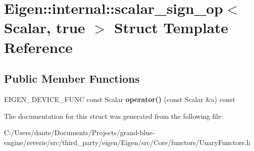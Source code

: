 \hypertarget{struct_eigen_1_1internal_1_1scalar__sign__op_3_01_scalar_00_01true_01_4}{}\section{Eigen\+::internal\+::scalar\+\_\+sign\+\_\+op$<$ Scalar, true $>$ Struct Template Reference}
\label{struct_eigen_1_1internal_1_1scalar__sign__op_3_01_scalar_00_01true_01_4}
\subsection*{Public Member Functions}
\begin{DoxyCompactItemize}
\item 
\mbox{\label{struct_eigen_1_1internal_1_1scalar__sign__op_3_01_scalar_00_01true_01_4_ab7a307311d19f2b54ce9805727b812a4}} 
E\+I\+G\+E\+N\+\_\+\+D\+E\+V\+I\+C\+E\+\_\+\+F\+U\+NC const Scalar {\bfseries operator()} (const Scalar \&a) const
\end{DoxyCompactItemize}


The documentation for this struct was generated from the following file\+:\begin{DoxyCompactItemize}
\item 
C\+:/\+Users/dante/\+Documents/\+Projects/grand-\/blue-\/engine/reverie/src/third\+\_\+party/eigen/\+Eigen/src/\+Core/functors/Unary\+Functors.\+h\end{DoxyCompactItemize}
